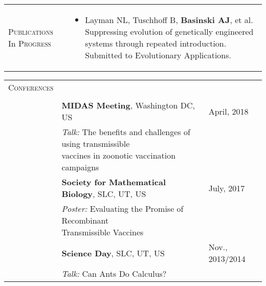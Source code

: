 \documentclass[11pt]{article}
\newcommand{\cellone}{2.5cm}
\newcommand{\celltwo}{12cm}
\newcommand{\cellthree}{4cm}
\newcommand{\spa}{\vspace{.4in}}
\begin{document}
\spa

\newpage

\begin{tabularx}{\textwidth}{p{\cellone} p{\celltwo}}
  \parbox[t][0cm]{\cellone}{P\textsc{ublications} In P\textsc{rogress}} &  \parbox[t][0cm]{12cm}{ 
    \begin{itemize}
    \item Layman NL, Tuschhoff B, {\bf Basinski AJ}, et al. Suppressing evolution of genetically engineered systems through repeated introduction. Submitted to Evolutionary Applications. 
      
    \end{itemize}
  }
\end{tabularx}

\spa
\spa
\spa
\spa
\begin{tabularx}{\textwidth}{p{\cellone} p{\celltwo} p{\cellthree}}
  \parbox[t][0cm]{\cellone}{C\textsc{onferences}}\\ \\

  \parbox[t][0cm]{\cellone}{}  & \parbox[t][]{\celltwo}{{\bf MIDAS Meeting}, Washington DC, US} & \parbox[t][]{\cellthree}{April, 2018} \\ 
  & \hspace{.2in} \parbox[t][]{\celltwo}{ \emph{Talk: } The benefits and challenges of using transmissible \\
  vaccines in zoonotic vaccination campaigns} \\

  & \vspace{0.1in} \parbox[t][]{\celltwo}{{\bf Society for Mathematical Biology}, SLC, UT, US} & \vspace{0.1in} \parbox[t][]{\cellthree}{July, 2017} \\ 
  & \hspace{.2in} \parbox[t][]{\celltwo}{ \emph{Poster: } Evaluating the Promise of Recombinant \\ Transmissible Vaccines} \\

  
  & \vspace{0.1in} \parbox[t][]{\celltwo}{{\bf Science Day}, SLC, UT, US} & \vspace{0.1in} \parbox[t][]{\cellthree}{Nov., 2013/2014} \\ 
  & \hspace{.2in} \parbox[t][]{\celltwo}{ \emph{Talk: } Can Ants Do Calculus?}\\
  

\end{tabularx}
\end{document}

